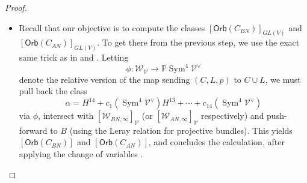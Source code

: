 \documentclass[12 pt, reqno]{amsart}
\theoremstyle{definition}
\newcommand{\on}{\operatorname}
\newcommand{\mb}{\mathbb}
\newcommand{\mc}{\mathcal}
\renewcommand{\P}{\mb{P}}
\newcommand{\Orb}{\mathsf{Orb}}
\begin{document}
\begin{proof}
\begin{itemize}
  \item[{\bf Step 7}:] Recall that our objective is to compute the
    classes $[ \Orb({C_{BN}})]_{GL(V)}$ and
    $[\Orb({C_{AN}})]_{GL(V)}$.  To get there from the previous
    step, we use the exact same trick as in  and
    \cite[Theorem 3.1]{FNR06}.  Letting
    \[\phi: \mathcal{W}_{\mathcal{V}} \to \P
      \on{Sym}^{4}\mathcal{V}^{\vee}\] denote the relative version of
    the map sending $(C,L,p)$ to $C \cup L$, we must pull back the class
    \[\alpha =
      H^{14}+c_1(\on{Sym}^4\mc{V}^{\vee})H^{13}+\cdots+c_{14}(\on{Sym}^4\mc{V}^{\vee})\]
    via $\phi$, intersect with
    $[\mathcal{W}_{BN,\infty}]_{\mathcal{V}}$ (or
    $[\mathcal{W}_{AN,\infty}]_{\mathcal{V}}$ respectively) and
    push-forward to $B$ (using the Leray relation for projective
    bundles).  This yields $[\Orb(C_{BN})]$ and $[\Orb({C_{AN}})]$,
    and concludes the calculation, after applying the change of
    variables .

    \end{itemize}

\end{proof}
\end{document}
